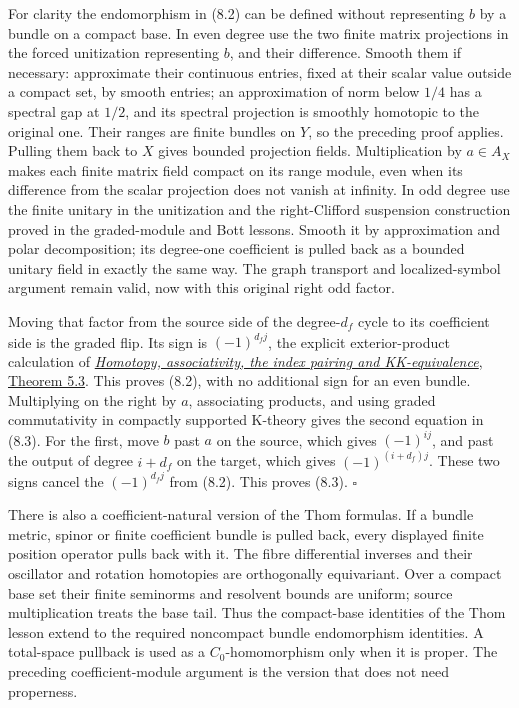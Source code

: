 \documentclass[
  11pt,
]{article}
\begin{document}
For clarity the endomorphism in (8.2) can be defined without
representing \(b\) by a bundle on a compact base. In even degree use the
two finite matrix projections in the forced unitization representing
\(b\), and their difference. Smooth them if necessary: approximate their
continuous entries, fixed at their scalar value outside a compact set,
by smooth entries; an approximation of norm below \(1/4\) has a spectral
gap at \(1/2\), and its spectral projection is smoothly homotopic to the
original one. Their ranges are finite bundles on \(Y\), so the preceding
proof applies. Pulling them back to \(X\) gives bounded projection
fields. Multiplication by \(a\in A_X\) makes each finite matrix field
compact on its range module, even when its difference from the scalar
projection does not vanish at infinity. In odd degree use the finite
unitary in the unitization and the right-Clifford suspension
construction proved in the graded-module and Bott lessons. Smooth it by
approximation and polar decomposition; its degree-one coefficient is
pulled back as a bounded unitary field in exactly the same way. The
graph transport and localized-symbol argument remain valid, now with
this original right odd factor.

Moving that factor from the source side of the degree-\(d_f\) cycle to
its coefficient side is the graded flip. Its sign is \((-1)^{d_fj}\),
the explicit exterior-product calculation of
\href{KT-KK-10.html\#5-naturality-composition-and-rings}{\emph{Homotopy,
associativity, the index pairing and KK-equivalence}, Theorem 5.3}. This
proves (8.2), with no additional sign for an even bundle. Multiplying on
the right by \(a\), associating products, and using graded commutativity
in compactly supported K-theory gives the second equation in (8.3). For
the first, move \(b\) past \(a\) on the source, which gives
\((-1)^{ij}\), and past the output of degree \(i+d_f\) on the target,
which gives \((-1)^{(i+d_f)j}\). These two signs cancel the
\((-1)^{d_fj}\) from (8.2). This proves (8.3). \(\square\)

There is also a coefficient-natural version of the Thom formulas. If a
bundle metric, spinor or finite coefficient bundle is pulled back, every
displayed finite position operator pulls back with it. The fibre
differential inverses and their oscillator and rotation homotopies are
orthogonally equivariant. Over a compact base set their finite seminorms
and resolvent bounds are uniform; source multiplication treats the base
tail. Thus the compact-base identities of the Thom lesson extend to the
required noncompact bundle endomorphism identities. A total-space
pullback is used as a \(C_0\)-homomorphism only when it is proper. The
preceding coefficient-module argument is the version that does not need
properness.
\end{document}
